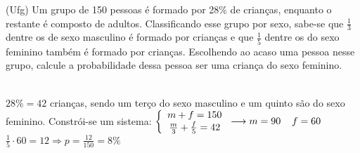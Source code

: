 \begin{ex}
	(Ufg) Um grupo de 150 pessoas é formado por 28\% de crianças, enquanto o restante é composto de adultos. Classificando esse grupo por sexo, sabe-se que $\frac{1}{3}$ dentre os de sexo masculino é formado por crianças e que $\frac{1}{5}$ dentre os do sexo feminino também é formado por crianças. Escolhendo ao  acaso uma pessoa nesse grupo, calcule a probabilidade dessa pessoa ser uma criança do sexo feminino.
	  \begin{sol}
	    \phantom{A} \\  
	   $ 28\% = 42 $ crianças, sendo um terço do sexo masculino e um quinto são do sexo feminino. Constrói-se um sistema:
	      $
	      \left\{
	      \begin{array}{cl}
	        m+f=150 \\
	        \frac{m}{3}+\frac{f}{5}=42\\
	      \end{array}
	      \right.
	      \longrightarrow m=90\hspace{0,4 cm} f=60 $ \\ $\frac{1}{5}\cdot60=12\Longrightarrow p=\frac{12}{150}= 8\% $
	  \end{sol}
\end{ex}